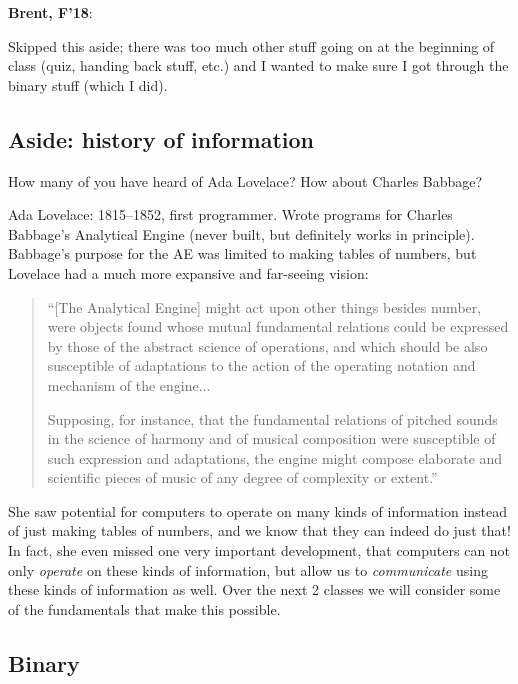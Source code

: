 \documentclass{article}
\newenvironment{reflect}[1]
{
  \noindent
  \begin{lrbox}{\reflectbox}
    \begin{minipage}[t]{\textwidth}
      \textbf{#1}:
}{
    \end{minipage}
  \end{lrbox}
  \fbox{\usebox{\reflectbox}}
}
\begin{document}
\begin{reflect}{Brent, F'18}
  Skipped this aside; there was too much other stuff going on at the
  beginning of class (quiz, handing back stuff, etc.) and I wanted to
  make sure I got through the binary stuff (which I did).
\end{reflect}

\subsection*{Aside: history of information}

How many of you have heard of Ada Lovelace?  How about Charles
Babbage?

Ada Lovelace: 1815--1852, first programmer.  Wrote
programs for Charles Babbage's Analytical Engine (never built, but
definitely works in principle).  Babbage's purpose for the AE was
limited to making tables of numbers, but Lovelace had a much more
expansive and far-seeing vision:

\begin{quote}
``[The Analytical Engine] might act upon other things besides number,
were objects found whose mutual fundamental relations could be
expressed by those of the abstract science of operations, and which
should be also susceptible of adaptations to the action of the
operating notation and mechanism of the engine...

Supposing, for instance, that the fundamental relations of pitched
sounds in the science of harmony and of musical composition were
susceptible of such expression and adaptations, the engine might
compose elaborate and scientific pieces of music of any degree of
complexity or extent.''
\end{quote}

She saw potential for computers to operate on many kinds of
information instead of just making tables of numbers, and we know that
they can indeed do just that!  In fact, she even missed one very
important development, that computers can not only \emph{operate} on
these kinds of information, but allow us to \emph{communicate} using
these kinds of information as well.  Over the next 2 classes we will
consider some of the fundamentals that make this possible.

\subsection*{Binary}
\end{document}
